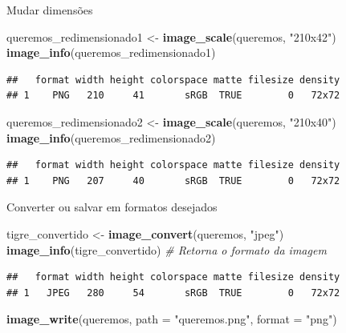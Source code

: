 \documentclass[
  ignorenonframetext,
]{beamer}
\newenvironment{Shaded}{\begin{snugshade}}{\end{snugshade}}
\newcommand{\CommentTok}[1]{\textcolor[rgb]{0.56,0.35,0.01}{\textit{#1}}}
\newcommand{\DataTypeTok}[1]{\textcolor[rgb]{0.13,0.29,0.53}{#1}}
\newcommand{\KeywordTok}[1]{\textcolor[rgb]{0.13,0.29,0.53}{\textbf{#1}}}
\newcommand{\NormalTok}[1]{#1}
\newcommand{\StringTok}[1]{\textcolor[rgb]{0.31,0.60,0.02}{#1}}
\begin{document}
\begin{frame}[fragile]{Mudar dimensões}
\protect\hypertarget{mudar-dimensuxf5es-2}{}

\small

\begin{Shaded}
\begin{Highlighting}[]
\NormalTok{queremos_redimensionado1 <-}\StringTok{ }\KeywordTok{image_scale}\NormalTok{(queremos, }\StringTok{"210x42"}\NormalTok{)}
\KeywordTok{image_info}\NormalTok{(queremos_redimensionado1)}
\end{Highlighting}
\end{Shaded}

\begin{verbatim}
##   format width height colorspace matte filesize density
## 1    PNG   210     41       sRGB  TRUE        0   72x72
\end{verbatim}

\begin{Shaded}
\begin{Highlighting}[]
\NormalTok{queremos_redimensionado2 <-}\StringTok{ }\KeywordTok{image_scale}\NormalTok{(queremos, }\StringTok{"210x40"}\NormalTok{)}
\KeywordTok{image_info}\NormalTok{(queremos_redimensionado2)}
\end{Highlighting}
\end{Shaded}

\begin{verbatim}
##   format width height colorspace matte filesize density
## 1    PNG   207     40       sRGB  TRUE        0   72x72
\end{verbatim}

\end{frame}

\begin{frame}[fragile]{Converter ou salvar em formatos desejados}
\protect\hypertarget{converter-ou-salvar-em-formatos-desejados}{}

\small

\begin{Shaded}
\begin{Highlighting}[]
\NormalTok{tigre_convertido <-}\StringTok{ }\KeywordTok{image_convert}\NormalTok{(queremos, }\StringTok{"jpeg"}\NormalTok{)}
\KeywordTok{image_info}\NormalTok{(tigre_convertido) }\CommentTok{# Retorna o formato da imagem}
\end{Highlighting}
\end{Shaded}

\begin{verbatim}
##   format width height colorspace matte filesize density
## 1   JPEG   280     54       sRGB  TRUE        0   72x72
\end{verbatim}

\begin{Shaded}
\begin{Highlighting}[]
\KeywordTok{image_write}\NormalTok{(queremos, }\DataTypeTok{path =} \StringTok{"queremos.png"}\NormalTok{, }\DataTypeTok{format =} \StringTok{"png"}\NormalTok{)}
\end{Highlighting}
\end{Shaded}

\end{frame}
\end{document}
